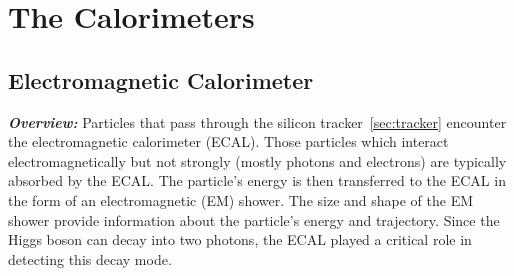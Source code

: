 \section{The Calorimeters}
\label{sec:calo}

\subsection{Electromagnetic Calorimeter}
\label{sec:ecal}

\textit{\textbf{Overview:}}
Particles that pass through the silicon tracker~\ref{sec:tracker} encounter the electromagnetic calorimeter (ECAL).
Those particles which interact electromagnetically but not strongly (\ie mostly photons and electrons) are typically absorbed by the ECAL.
The particle's energy is then transferred to the ECAL in the form of an electromagnetic (EM) shower.
The size and shape of the EM shower provide information about the particle's energy and trajectory.
Since the Higgs boson can decay into two photons, the ECAL played a critical role in detecting this decay mode.

